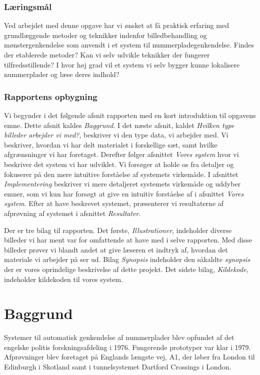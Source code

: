 \subsubsection*{Læringsmål}
Ved arbejdet med denne opgave har vi ønsket at få praktisk erfaring med grundlæggende metoder og teknikker indenfor billedbehandling og mønstergenkendelse som anvendt i et system til nummerpladegenkendelse. Findes der etablerede metoder? Kan vi selv udvikle teknikker der fungerer tilfredsstillende? I hvor høj grad vil et system vi selv bygger kunne lokalisere nummerplader og læse deres indhold?

\subsubsection*{Rapportens opbygning}
Vi begynder i det følgende afsnit rapporten med en kort introduktion til opgavens emne. Dette afsnit kaldes \textit{Baggrund}. I det næste afsnit, kaldet \textit{Hvilken type billeder arbejder vi med?}, beskriver vi den type data, vi arbejder med. Vi beskriver, hvordan vi har delt materialet i forskellige sæt, samt hvilke afgrænsninger vi har foretaget. Derefter følger afsnittet \textit{Vores system} hvor vi beskriver det system vi har udviklet. Vi forsøger at holde os fra detaljer og fokuserer på den mere intuitive forståelse af systemets virkemåde. I afsnittet \textit{Implementering} beskriver vi mere detaljeret systemets virkemåde og uddyber emner, som vi kun har forsøgt at give en intuitiv forståelse af i afsnittet \textit{Vores system}. Efter at have beskrevet systemet, præsenterer vi resultaterne af afprøvning af systemet i afsnittet \textit{Resultater}.

Der er tre bilag til rapporten. Det første, \textit{Illustrationer}, indeholder diverse billeder vi har ment var for omfattende at have med i selve rapporten. Med disse billeder prøver vi blandt andet at give læseren et indtryk af, hvordan det materiale vi arbejder på ser ud. Bilag \textit{Synopsis} indeholder den såkaldte \textit{synopsis} der er vores oprindelige beskrivelse af dette projekt. Det sidste bilag, \textit{Kildekode}, indeholder kildekoden til vores system.

\section{Baggrund}
Systemer til automatisk genkendelse af nummerplader blev opfundet af det engelske politis forskningsafdeling i 1976. Fungerende prototyper var klar i 1979. Afprøvninger blev foretaget på Englands længste vej, A1, der løber fra London til Edinburgh i Skotland samt i tunnelsystemet Dartford Crossings i London\cite{wiki_baggrund}. 

